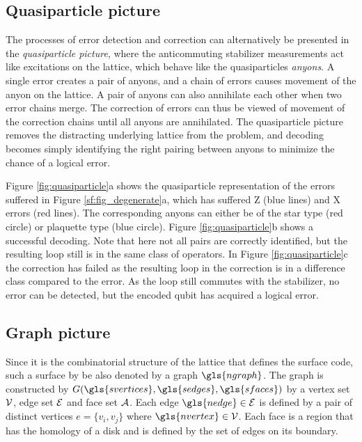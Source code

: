 \subsection{Quasiparticle picture}\label{sec:quasiparticle}
The processes of error detection and correction can alternatively be presented in the \emph{quasiparticle picture}, where the anticommuting stabilizer measurements act like excitations on the lattice, which behave like the quasiparticles \emph{anyons}. A single error creates a pair of anyons, and a chain of errors causes movement of the anyon on the lattice. A pair of anyons can also annihilate each other when two error chains merge. The correction of errors can thus be viewed of movement of the correction chains until all anyons are annihilated. The quasiparticle picture removes the distracting underlying lattice from the problem, and decoding becomes simply identifying the right pairing between anyons to minimize the chance of a logical error.


Figure \ref{fig:quasiparticle}a shows the quasiparticle representation of the errors suffered in Figure \ref{sf:fig_degenerate}a, which has suffered Z (blue lines) and X errors (red lines). The corresponding anyons can either be of the star type (red circle) or plaquette type (blue circle). Figure \ref{fig:quasiparticle}b shows a successful decoding. Note that here not all pairs are correctly identified, but the resulting loop still is in the same class of operators. In Figure \ref{fig:quasiparticle}c the correction has failed as the resulting loop in the correction is in a difference class compared to the error. As the loop still commutes with the stabilizer, no error can be detected, but the encoded qubit has acquired a logical error.


\subsection{Graph picture}\label{sec:toricgraph}
Since it is the combinatorial structure of the lattice that defines the surface code, such a surface by be also denoted by a graph $\gls{ngraph}$. The graph is constructed by $G(\gls{svertices}, \gls{sedges}, \gls{sfaces})$ by a vertex set $\mathcal{V}$, edge set $\mathcal{E}$ and face set $\mathcal{A}$. Each edge $\gls{nedge}\in \m{E}$ is defined by a pair of distinct vertices $e=\{v_i, v_j\}$ where $\gls{nvertex}\in \m{V}$. Each face is a region that has the homology of a disk and is defined by the set of edges on its boundary. 

